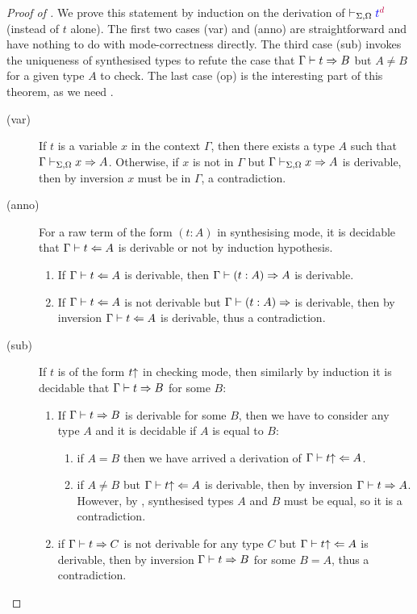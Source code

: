 \begin{proof}[Proof of {}]
  We prove this statement by induction on the derivation of $\vdash_{\Sigma, \Omega} {\textcolor{blue}{t}}^{\mathrel{\textcolor{purple}{d}}}$ (instead of $t$ alone).
  The first two cases (var) and (anno) are straightforward and have nothing to do with mode-correctness directly.
  The third case (sub) invokes the uniqueness of synthesised types to refute the case that $\Gamma \vdash t \Rightarrow B$ but $A \neq B$ for a given type $A$ to check.
  The last case (op) is the interesting part of this theorem, as we need .
  \begin{description}
    \item[(var)] If $t$ is a variable $x$ in the context $\Gamma$, then there exists a type $A$ such that $\Gamma \vdash_{\Sigma, \Omega} x \Rightarrow A$.
      Otherwise, if $x$ is not in $\Gamma$ but $\Gamma \vdash_{\Sigma, \Omega} x \Rightarrow A$ is derivable, then by inversion $x$ must be in $\Gamma$, a contradiction.
    \item[(anno)] For a raw term of the form $(t : A)$ in synthesising mode, it is decidable that $\Gamma \vdash t \Leftarrow A$ is derivable or not by induction hypothesis.
      \begin{enumerate}
        \item If $\Gamma \vdash t \Leftarrow A$ is derivable, then $\Gamma \vdash (t : A) \Rightarrow A$ is derivable.
        \item If $\Gamma \vdash t \Leftarrow A$ is not derivable but $\Gamma \vdash (t : A) \Rightarrow$ is derivable, then by inversion $\Gamma \vdash t \Leftarrow A$ is derivable, thus a contradiction.
      \end{enumerate}
      
    \item[(sub)] If $t$ is of the form $t\mathord{\uparrow}$ in checking mode, then similarly by induction it is decidable that $\Gamma \vdash t \Rightarrow B$ for some $B$:
      \begin{enumerate}
        \item If $\Gamma \vdash t \Rightarrow B$ is derivable for some $B$, then we have to consider any type $A$ and it is decidable if $A$ is equal to $B$:
          \begin{enumerate}
            \item if $A = B$ then we have arrived a derivation of $\Gamma \vdash t\mathord{\uparrow} \Leftarrow A$.
            \item if $A \neq B$ but $\Gamma \vdash t \mathord{\uparrow} \Leftarrow A$ is derivable, then by inversion $\Gamma \vdash t \Rightarrow A$.
              However, by , synthesised types $A$ and $B$ must be equal, so it is a contradiction.
          \end{enumerate}
        \item if $\Gamma \vdash t \Rightarrow C$ is not derivable for any type $C$ but $\Gamma \vdash t\mathord{\uparrow} \Leftarrow A$ is derivable, then by inversion $\Gamma \vdash t \Rightarrow B$ for some $B = A$, thus a contradiction.
      \end{enumerate}
      

\end{description}
\end{proof}

